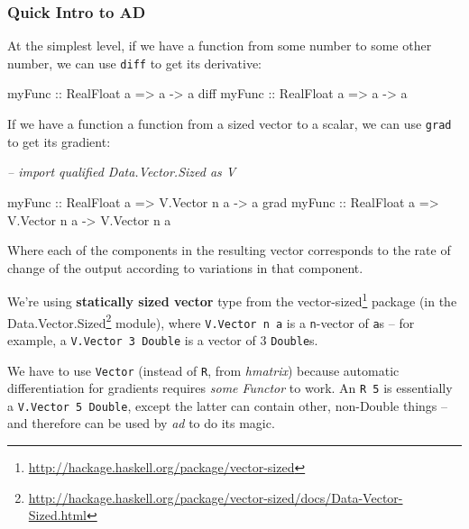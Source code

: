 \documentclass[]{article}
\newenvironment{Shaded}{}{}
\newcommand{\DataTypeTok}[1]{\textcolor[rgb]{0.56,0.13,0.00}{#1}}
\newcommand{\CommentTok}[1]{\textcolor[rgb]{0.38,0.63,0.69}{\textit{#1}}}
\newcommand{\OtherTok}[1]{\textcolor[rgb]{0.00,0.44,0.13}{#1}}
\newcommand{\NormalTok}[1]{#1}
\renewcommand{\href}[2]{#2\footnote{\url{#1}}}
\begin{document}
\subsubsection{Quick Intro to AD}\label{quick-intro-to-ad}

At the simplest level, if we have a function from some number to some other
number, we can use \texttt{diff} to get its derivative:

\begin{Shaded}
\begin{Highlighting}[]
\OtherTok{myFunc      ::} \DataTypeTok{RealFloat}\NormalTok{ a }\OtherTok{=>}\NormalTok{ a }\OtherTok{->}\NormalTok{ a}
\NormalTok{diff}\OtherTok{ myFunc ::} \DataTypeTok{RealFloat}\NormalTok{ a }\OtherTok{=>}\NormalTok{ a }\OtherTok{->}\NormalTok{ a}
\end{Highlighting}
\end{Shaded}

If we have a function a function from a sized vector to a scalar, we can use
\texttt{grad} to get its gradient:

\begin{Shaded}
\begin{Highlighting}[]
\CommentTok{-- import qualified Data.Vector.Sized as V}

\OtherTok{myFunc      ::} \DataTypeTok{RealFloat}\NormalTok{ a }\OtherTok{=>} \DataTypeTok{V.Vector}\NormalTok{ n a }\OtherTok{->}\NormalTok{ a}
\NormalTok{grad}\OtherTok{ myFunc ::} \DataTypeTok{RealFloat}\NormalTok{ a }\OtherTok{=>} \DataTypeTok{V.Vector}\NormalTok{ n a }\OtherTok{->} \DataTypeTok{V.Vector}\NormalTok{ n a}
\end{Highlighting}
\end{Shaded}

Where each of the components in the resulting vector corresponds to the rate of
change of the output according to variations in that component.

We're using \textbf{statically sized vector} type from the
\href{http://hackage.haskell.org/package/vector-sized}{vector-sized} package (in
the
\href{http://hackage.haskell.org/package/vector-sized/docs/Data-Vector-Sized.html}{Data.Vector.Sized}
module), where \texttt{V.Vector\ n\ a} is a \texttt{n}-vector of \texttt{a}s --
for example, a \texttt{V.Vector\ 3\ Double} is a vector of 3 \texttt{Double}s.

We have to use \texttt{Vector} (instead of \texttt{R}, from \emph{hmatrix})
because automatic differentiation for gradients requires \emph{some Functor} to
work. An \texttt{R\ 5} is essentially a \texttt{V.Vector\ 5\ Double}, except the
latter can contain other, non-Double things -- and therefore can be used by
\emph{ad} to do its magic.
\end{document}
